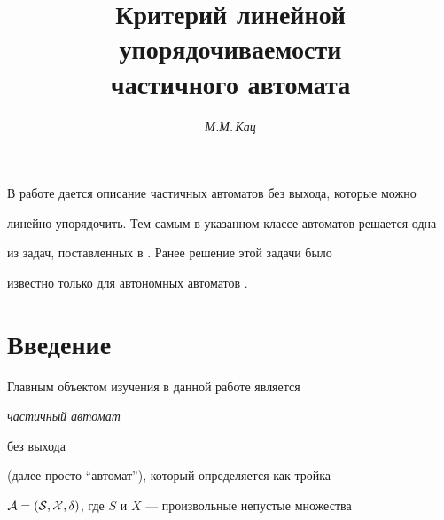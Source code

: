 

\author{\it М.М.\,Кац}


\title{Критерий линейной упорядочиваемости\\


частичного автомата}





\date{}







\pagestyle{plain} %













\maketitle










В работе дается описание частичных автоматов без выхода, которые можно


линейно упорядочить. Тем самым в указанном классе автоматов решается одна


из задач, поставленных в \cite{Bog}. Ранее решение этой задачи было


известно только для автономных автоматов \cite{Rub}.





\section{Введение}





Главным объектом изучения в данной работе является {\em частичный автомат


без выхода} (далее просто ``автомат''), который определяется как тройка


$\cal A=(S,X,\delta)$, где $S$ и $X$ --- произвольные непустые множества


